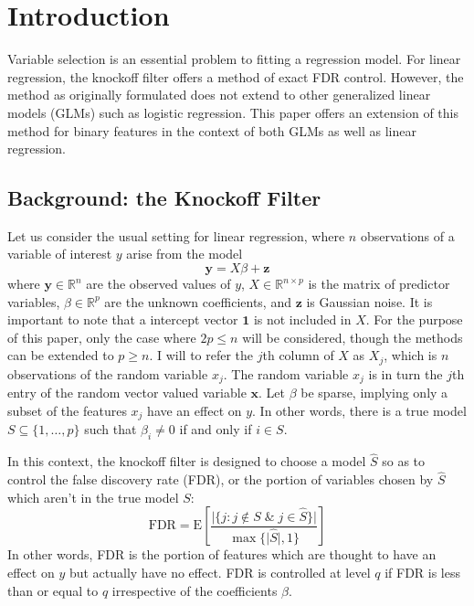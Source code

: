 \documentclass[11pt]{article}
\newcommand{\R}{\mathbb{R}}
\newcommand{\E}{\mathrm{E}}
\theoremstyle{definition}
\begin{document}
\newpage


\section{Introduction}
Variable selection is an essential problem to fitting a regression model. For linear regression, the knockoff filter \cite{2014arXiv1404.5609F} offers a method of exact FDR control. However, the method as originally formulated does not extend to other generalized linear models (GLMs) such as logistic regression. This paper offers an extension of this method for binary features in the context of both GLMs as well as linear regression.
    
\subsection{Background: the Knockoff Filter}
    Let us consider the usual setting for linear regression, where $n$ observations of a variable of interest $y$ arise from the model
    \[\mathbf{y} = X\beta + \mathbf{z}\]
    where $\mathbf{y}\in\R^n$ are the observed values of $y$, $X \in \R^{n\times p}$ is the matrix of predictor variables, $\beta\in\R^p$ are the unknown coefficients, and $\mathbf z$ is Gaussian noise. It is important to note that a intercept vector $\mathbf 1$ is not included in $X$. For the purpose of this paper, only the case where $2p\leq n$ will be considered, though the methods can be extended to $p\geq n$. I will to refer the $j$th column of $X$ as $X_j$, which is $n$ observations of the random variable $x_j$. The random variable $x_j$ is in turn the $j$th entry of the random vector valued variable $\mathbf x$. Let $\beta$ be sparse, implying only a subset of the features $x_j$ have an effect on  $y$. In other words, there is a true model $S\subseteq \{1,\ldots,p\}$ such that $\beta_i\neq0$ if and only if $i\in S$. \par
     In this context, the knockoff filter is designed to choose a model $\hat S$ so as to control the false discovery rate (FDR), or the portion of variables chosen by $\hat S$ which aren't in the true model $S$:
    \[ \textrm{FDR} = \E\left[\frac{\vert{\{j: j\not\in S \; \& \; j\in\hat S\}}\vert}{\max\{\vert{\hat S}\vert,1\}} \right] \]
    In other words, FDR is the portion of features which are thought to have an effect on $y$ but actually have no effect. FDR is controlled at level $q$ if FDR is less than or equal to $q$ irrespective of the coefficients $\beta$. \par
\end{document}
